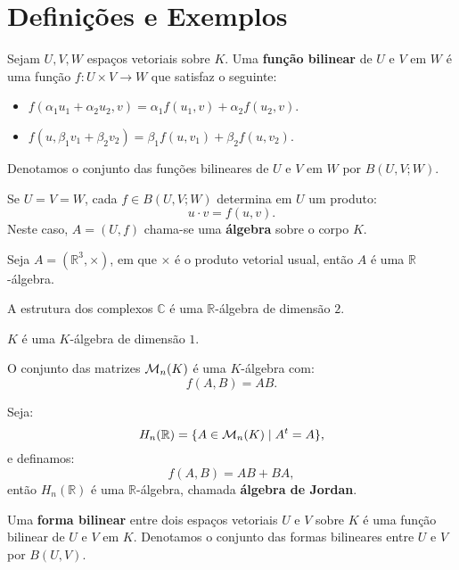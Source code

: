\documentclass[11pt,twoside,a4paper]{book}
\begin{document}
\section{Definições e Exemplos}

\begin{definicao}
Sejam $U,V,W$ espaços vetoriais sobre $K$. Uma \textbf{função bilinear} de $U$ e $V$ em $W$ é uma função $f:U\times V\rightarrow W$ que satisfaz o seguinte:
\begin{itemize}
\item $f(\alpha_1u_1+\alpha_2u_2,v)=\alpha_1f(u_1,v)+\alpha_2f(u_2,v)$.
\item $f(u,\beta_1v_1+\beta_2v_2)=\beta_1f(u,v_1)+\beta_2f(u,v_2)$.
\end{itemize}
Denotamos o conjunto das funções bilineares de $U$ e $V$ em $W$ por $B(U,V;W)$.
\end{definicao}

\begin{definicao}
Se $U=V=W$, cada $f\in B(U,V;W)$ determina em $U$ um produto:
\[
u\cdot v=f(u,v).
\]
Neste caso, $A=(U,f)$ chama-se uma \textbf{álgebra} sobre o corpo $K$.
\end{definicao}

\begin{exemplo}
Seja $A=(\mathbb{R}^3,\times)$, em que $\times$ é o produto vetorial usual, então $A$ é uma $\mathbb{R}$-álgebra.
\end{exemplo}

\begin{exemplo}
A estrutura dos complexos $\mathbb{C}$ é uma $\mathbb{R}$-álgebra de dimensão $2$.
\end{exemplo}

\begin{exemplo}
$K$ é uma $K$-álgebra de dimensão $1$.
\end{exemplo}

\begin{exemplo}
O conjunto das matrizes $\mathcal{M}_{n}(K)$ é uma $K$-álgebra com:
\[
f(A,B)=AB.
\]
\end{exemplo}

\begin{exemplo}
Seja:
\[
H_n(\mathbb{R})=\{A\in\mathcal{M}_{n}(K)\mid A^t=A\},
\]
e definamos:
\[
f(A,B)=AB+BA,
\]
então $H_n(\mathbb{R})$ é uma $\mathbb{R}$-álgebra, chamada \textbf{álgebra de Jordan}.
\end{exemplo}

\begin{definicao}
Uma \textbf{forma bilinear} entre dois espaços vetoriais $U$ e $V$ sobre $K$ é uma função bilinear de $U$ e $V$ em $K$. Denotamos o conjunto das formas bilineares entre $U$ e $V$ por $B(U,V)$.
\end{definicao}
\end{document}
